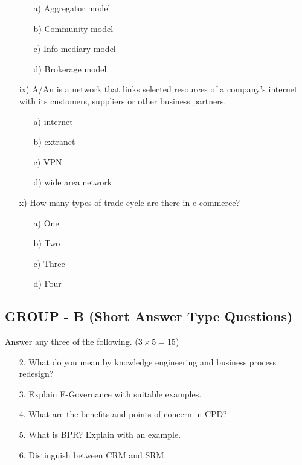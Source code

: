 \documentclass{article}
\begin{document}
\begin{enumerate}
\begin{enumerate}
        \item[a)] Aggregator model
        \item[b)] Community model
        \item[c)] Info-mediary model
        \item[d)] Brokerage model.
    \end{enumerate}
    \item[ix)] A/An \underline{\hspace{2cm}} is a network that links selected resources of a company's internet with its customers, suppliers or other business partners.
    \begin{enumerate}
        \item[a)] internet
        \item[b)] extranet
        \item[c)] VPN
        \item[d)] wide area network
    \end{enumerate}
    \item[x)] How many types of trade cycle are there in e-commerce?
    \begin{enumerate}
        \item[a)] One
        \item[b)] Two
        \item[c)] Three
        \item[d)] Four
    \end{enumerate}
\end{enumerate}

\subsection*{GROUP - B (Short Answer Type Questions)}
Answer any three of the following. ($3 \times 5 = 15$)
\begin{enumerate}
    \item[2.] What do you mean by knowledge engineering and business process redesign?
    \item[3.] Explain E-Governance with suitable examples.
    \item[4.] What are the benefits and points of concern in CPD?
    \item[5.] What is BPR? Explain with an example.
    \item[6.] Distinguish between CRM and SRM.
\end{enumerate}
\end{document}
